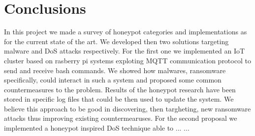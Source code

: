 \chapter{Conclusions}
In this project we made a survey of honeypot categories and implementations as for the current state of the art. We developed then two solutions targeting malware and DoS attacks respectively. For the first one we implemented an IoT cluster based on rasberry pi systems exploting MQTT communication protocol to send and receive bash commands. We showed how malwares, ransomware specifically, could interact in such a system and proposed some common countermeasures to the problem. Results of the honeypot research have been stored in specific log files that could be then used to update the system. We believe this approach to be good in discovering, then targheting, new ransomware attacks thus improving existing countermearuses. For the second proposal we implemented a honeypot inspired DoS technique able to ... ...